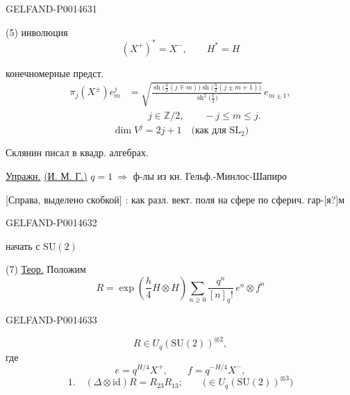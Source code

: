 \begin{GelfandAdjacentEvidence}{GELFAND-P001463}{1}

(5) инволюция
\[
(X^+)^*=X^-,\qquad H^*=H
\]

конечномерные предст.
\begin{equation*}
\begin{aligned}
\pi_j(X^\pm)e_m^j
&=\sqrt{\frac{\operatorname{sh}\bigl(\frac h2(j\mp m)\bigr)
\operatorname{sh}\bigl(\frac h2(j\pm m+1)\bigr)}
{\operatorname{sh}^2\bigl(\frac h2\bigr)}}\,e_{m\pm1},\\
&\hspace{2em}j\in\mathbb Z/2,\qquad -j\le m\le j.
\end{aligned}\tag{6}
\end{equation*}
\[
\dim V^j=2j+1\quad\text{(как для \(\mathrm{SL}_2\))}
\]

Склянин писал в квадр. алгебрах.

\underline{Упражн.} \underline{(И. М. Г.)} \(q=1\ \Rightarrow\) ф-лы из кн. Гельф.-Минлос-Шапиро

[Справа, выделено скобкой] : как разл. вект. поля на сфере по сферич. гар-[я?]м
\end{GelfandAdjacentEvidence}
\begin{GelfandAdjacentEvidence}{GELFAND-P001463}{2}


начать с \(\mathrm{SU}(2)\)

(7) \underline{Теор.} Положим
\begin{equation*}
R=\exp\left(\frac h4 H\otimes H\right)
  \sum_{n\ge0}\frac{q^n}{[n]_q!}\,e^n\otimes f^n
\tag{8}
\end{equation*}
\end{GelfandAdjacentEvidence}
\begin{GelfandAdjacentEvidence}{GELFAND-P001463}{3}


\[
R\in U_q(\mathrm{SU}(2))^{\otimes2},
\]
где
\begin{equation*}
e=q^{H/4}X^+,\qquad f=q^{-H/4}X^-,
\tag{9}
\end{equation*}
\begin{equation*}
1.\quad(\Delta\otimes\mathrm{id})R=R_{23}R_{13};\qquad
  \bigl(\in U_q(\mathrm{SU}(2))^{\otimes3}\bigr)
\tag{10}
\end{equation*}
\end{GelfandAdjacentEvidence}

